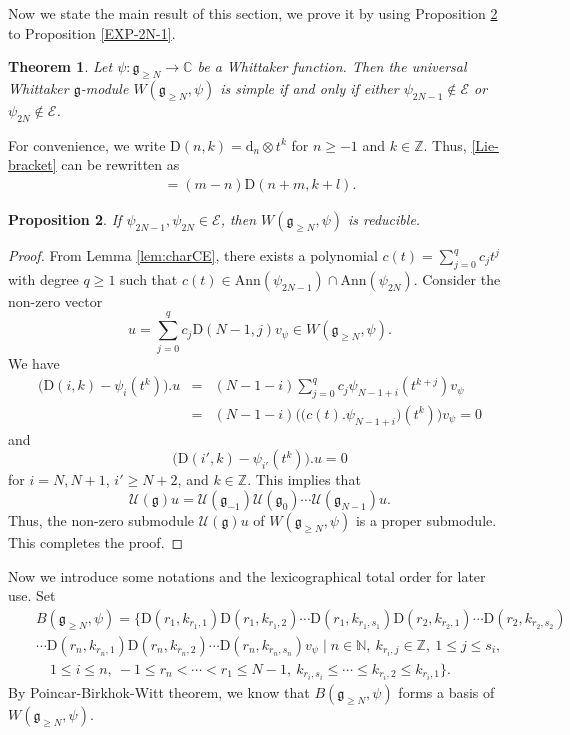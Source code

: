 \documentclass[12pt, a4paper]{amsart}
\newcommand{\fg}{\mathfrak g}
\newcommand{\C}{\mathbb{C}}
\newcommand{\N}{\mathbb N}
\newcommand{\Z}{\mathbb Z}
\newcommand{\rd}{\mathrm{d}}
\newcommand{\rD}{\mathrm{D}}
\newcommand{\U}{\mathcal{U}}
\theoremstyle{Theorem}
\theoremstyle{Theorem}
\newtheorem{thm}{Theorem}[section]
\newtheorem{proposition}[thm]{Proposition}
\numberwithin{equation}{section}
\begin{document}
Now we state the main result of this section, we prove it
by using Proposition \ref{psi-reducible} to Proposition \ref{EXP-2N-1}.
\begin{thm}\label{first-main-restlt}
Let $\psi:\fg_{\geq N}\rightarrow\C$ be a Whittaker function.
Then the universal Whittaker $\fg$-module $W(\fg_{\geq N},\psi)$ is simple if and only if
either $\psi_{2N-1}\notin\mathcal{E}$ or $\psi_{2N}\notin\mathcal{E}$.
\end{thm}
For convenience, we write $\rD(n,k)=\rd_{n}\otimes t^{k}$ for $n\geq-1$ and $k\in\Z$.
Thus, \eqref{Lie-bracket} can be rewritten as
\begin{align}
[\rD(n,k),\rD(m,l)]=(m-n)\rD(n+m,k+l).
\end{align}

\begin{proposition}\label{psi-reducible}
If $\psi_{2N-1},\psi_{2N}\in\mathcal{E}$, then $W(\fg_{\geq N},\psi)$ is reducible.
\end{proposition}
\begin{proof}
From Lemma \ref{lem:charCE}, there exists a polynomial $c(t)=\sum_{j=0}^{q}c_{j}t^{j}$
with degree $q\geq1$ such that $c(t)\in\mathrm{Ann}(\psi_{2N-1})\cap\mathrm{Ann}(\psi_{2N})$.
Consider the non-zero vector \[u=\sum_{j=0}^{q}c_{j}\rD(N-1,j)v_{\psi}\in W(\fg_{\geq N},\psi).\]
We have \begin{eqnarray*}
\big(\rD(i,k)-\psi_{i}(t^{k})\big).u&=&(N-1-i)\sum_{j=0}^{q}c_{j}\psi_{N-1+i}(t^{k+j})v_{\psi}\\
&=&(N-1-i)\Big(\big(c(t).\psi_{N-1+i}\big)(t^{k})\Big)v_{\psi}=0
\end{eqnarray*}
and
\[\big(\rD(i',k)-\psi_{i'}(t^{k})\big).u=0\]
for $i=N,N+1$, $i'\geq N+2$, and $k\in\Z$. This implies that \[\U(\fg)u=\U(\fg_{-1})\U(\fg_{0})\cdots\U(\fg_{N-1})u.\]
Thus, the non-zero submodule $\U(\fg)u$ of
$W(\fg_{\geq N},\psi)$ is a proper submodule. This completes the proof.
\end{proof}


Now we introduce some notations and the lexicographical total order for later use. Set
\begin{eqnarray*}&&B(\fg_{\geq N},\psi)=\{\rD(r_{1},k_{r_{1},1})\rD(r_{1},k_{r_{1},2})\cdots
\rD(r_{1},k_{r_{1},s_{1}})\rD(r_{2},k_{r_{2},1})\cdots
\rD(r_{2},k_{r_{2},s_{2}})\\&&
\cdots\rD(r_{n},k_{r_{n},1})\rD(r_{n},k_{r_{n},2})\cdots
\rD(r_{n},k_{r_{n},s_{n}})v_{\psi}\mid n\in\N,\ k_{r_{i},j}\in\Z,\ 1\leq j\leq s_{i},
\\&&\quad 1\leq i\leq n,\ -1\leq r_{n}<\cdots<r_{1}\leq N-1,\
k_{r_{i},s_{i}}\leq\cdots\leq k_{r_{i},2}\leq k_{r_{i},1}\}.\end{eqnarray*}
By Poincar-Birkhok-Witt theorem, we know that $B(\fg_{\geq N},\psi)$ forms a basis of $W(\fg_{\geq N},\psi)$.
\end{document}

